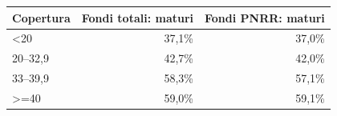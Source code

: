 \begin{tabular}{lrr}
\toprule
Copertura & Fondi totali: maturi & Fondi PNRR: maturi \\
\midrule
<20 & 37,1\% & 37,0\% \\
20--32,9 & 42,7\% & 42,0\% \\
33--39,9 & 58,3\% & 57,1\% \\
>=40 & 59,0\% & 59,1\% \\
\bottomrule
\end{tabular}
